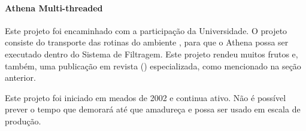 \paragraph{Athena Multi-threaded}

Este projeto foi encaminhado com a participação da Universidade. O projeto
consiste do transporte das rotinas do ambiente , para que o
Athena possa ser executado dentro do Sistema de Filtragem. Este projeto rendeu
muitos frutos e, também, uma publicação em revista () especializada,
como mencionado na seção anterior.

Este projeto foi iniciado em meados de 2002 e continua ativo. Não é possível
prever o tempo que demorará até que amadureça e possa ser usado em escala de
produção.

